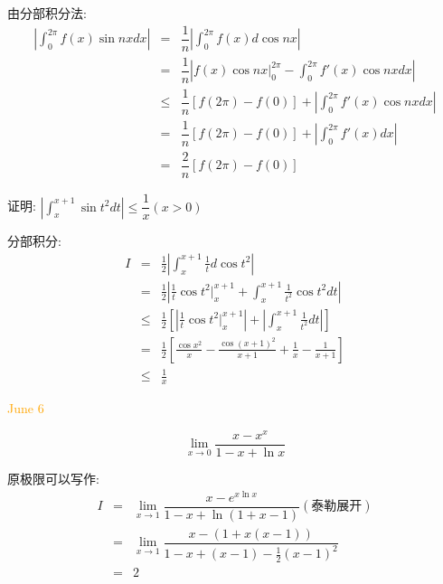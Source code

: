 \begin{solution}
	
	由分部积分法: 
	\begin{eqnarray*}
		\left| \int_{0}^{2\pi}f(x)\sin nxdx\right|&=&\dfrac{1}{n}\left| \int_{0}^{2\pi}f(x)d\cos nx\right|\\
		&=&\dfrac{1}{n}\left| f(x)\cos nx|_{0}^{2\pi}-\int_{0}^{2\pi}f'(x)\cos nxdx\right|\\
		&\leq &\dfrac{1}{n}[f(2\pi)-f(0)]+|\int_{0}^{2\pi}f'(x)\cos nxdx|\\
		&=&\dfrac{1}{n}[f(2\pi)-f(0)]+|\int_{0}^{2\pi}f'(x)dx|\\
		&=&\dfrac{2}{n}[f(2\pi)-f(0)]
	\end{eqnarray*}
\end{solution}

\begin{example}[][Exam: 32.1.9]
	证明: $\displaystyle{\left| \int_{x}^{x+1}\sin t^2dt\right| \leq \dfrac{1}{x}}(x > 0)$
\end{example}

\begin{solution}
	
	分部积分: 
	\begin{eqnarray*}
		I&=&\frac{1}{2}\left| \int_{x}^{x+1}\frac{1}{t}d\cos t^2\right|\\
		&=&\frac{1}{2}\left| \frac{1}{t}\cos t^2|_{x}^{x+1}+ \int_{x}^{x+1}\frac{1}{t^2}\cos t^2dt\right|\\
		&\leq&\frac{1}{2}[\left| \frac{1}{t}\cos t^2|_{x}^{x+1}\right|+\left|  \int_{x}^{x+1}\frac{1}{t^2}dt\right|]\\
		&=&\frac{1}{2}[\frac{\cos x^2}{x}-\frac{\cos(x+1)^2}{x+1}+\frac{1}{x}-\frac{1}{x+1}]\\
		&\leq&\frac{1}{x}
	\end{eqnarray*}
\end{solution}


\textcolor{orange}{June 6}

\begin{example}[][Exam: 32.1.10]
	$$\lim\limits_{x\to 0}\dfrac{x-x^{x}}{1-x+\ln x}$$
\end{example}

\begin{solution}
	
	原极限可以写作: 
	\begin{eqnarray*}
		I&=&\lim\limits_{x\to 1}\dfrac{x-e^{x\ln x}}{1-x+\ln(1+x-1)}(\text{泰勒展开})\\
		&=&\lim\limits_{x\to 1}\dfrac{x-(1+x(x-1))}{1-x+(x-1)-\frac{1}{2}(x-1)^2}\\
		&=&2
	\end{eqnarray*}
\end{solution}

